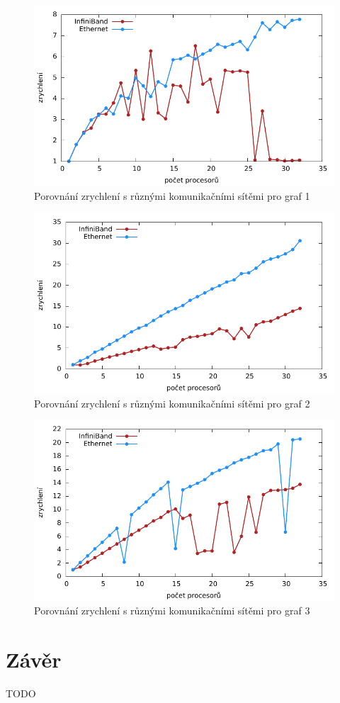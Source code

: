 \documentclass[12pt]{article}
\begin{document}
\begin{figure}
	\caption{Porovnání zrychlení s různými komunikačními sítěmi pro graf 1}
	\includegraphics{graphs/graph1-speedup.pdf}
\end{figure}

\begin{figure}
	\caption{Porovnání zrychlení s různými komunikačními sítěmi pro graf 2}
	\includegraphics{graphs/graph2-speedup.pdf}
\end{figure}

\begin{figure}
	\caption{Porovnání zrychlení s různými komunikačními sítěmi pro graf 3}
	\includegraphics{graphs/graph3-speedup.pdf}
\end{figure}

\section{Závěr}
TODO
\end{document}
